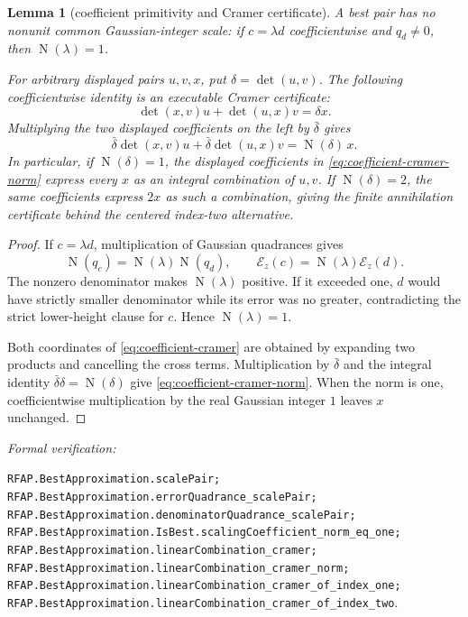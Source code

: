 \documentclass[11pt]{article}
\newtheorem{lemma}[lemma]{Lemma}
\newcommand{\Norm}[1]{\operatorname{N}\!\left(#1\right)}
\newcommand{\leanref}[1]{\par\smallskip\noindent
  \emph{Formal verification:}\par\nobreak
  {\raggedright\nolinkurl{#1}.\par}}
\begin{document}
\begin{lemma}[coefficient primitivity and Cramer certificate]
\label{lem:coefficient-cramer}
A best pair has no nonunit common Gaussian-integer scale: if
$c=\lambda d$ coefficientwise and $q_d\ne0$, then $\Norm\lambda=1$.

For arbitrary displayed pairs $u,v,x$, put
$\delta=\det(u,v)$.  The following coefficientwise identity is an executable
Cramer certificate:
\begin{equation}
\label{eq:coefficient-cramer}
 \det(x,v)u+\det(u,x)v=\delta x.
\end{equation}
Multiplying the two displayed coefficients on the left by $\bar\delta$ gives
\begin{equation}
\label{eq:coefficient-cramer-norm}
 \bar\delta\det(x,v)u+\bar\delta\det(u,x)v
      =\Norm\delta\,x.
\end{equation}
In particular, if $\Norm\delta=1$, the displayed coefficients in
\eqref{eq:coefficient-cramer-norm} express every $x$ as an integral
combination of $u,v$.  If $\Norm\delta=2$, the same coefficients express
$2x$ as such a combination, giving the finite annihilation certificate behind
the centered index-two alternative.
\end{lemma}

\begin{proof}
If $c=\lambda d$, multiplication of Gaussian quadrances gives
\[
 \Norm{q_c}=\Norm\lambda\Norm{q_d},
 \qquad
 \mathcal E_z(c)=\Norm\lambda\mathcal E_z(d).
\]
The nonzero denominator makes $\Norm\lambda$ positive.  If it exceeded one,
$d$ would have strictly smaller denominator while its error was no greater,
contradicting the strict lower-height clause for $c$.  Hence
$\Norm\lambda=1$.

Both coordinates of \eqref{eq:coefficient-cramer} are obtained by expanding
two products and cancelling the cross terms.  Multiplication by
$\bar\delta$ and the integral identity
$\bar\delta\delta=\Norm\delta$ give
\eqref{eq:coefficient-cramer-norm}.  When the norm is one, coefficientwise
multiplication by the real Gaussian integer $1$ leaves $x$ unchanged.
\end{proof}

\leanref{RFAP.BestApproximation.scalePair;
RFAP.BestApproximation.errorQuadrance_scalePair;
RFAP.BestApproximation.denominatorQuadrance_scalePair;
RFAP.BestApproximation.IsBest.scalingCoefficient_norm_eq_one;
RFAP.BestApproximation.linearCombination_cramer;
RFAP.BestApproximation.linearCombination_cramer_norm;
RFAP.BestApproximation.linearCombination_cramer_of_index_one;
RFAP.BestApproximation.linearCombination_cramer_of_index_two}
\end{document}
